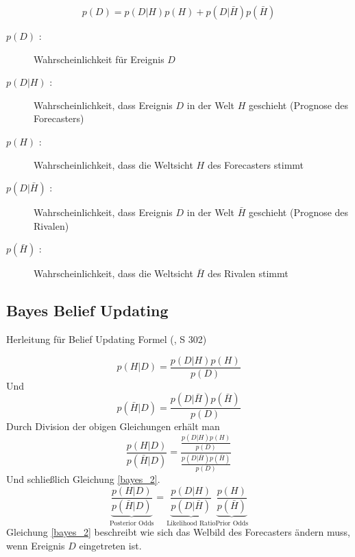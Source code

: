 \begin{equation}
p(D) = p(D \vert H) p(H) + p (D \vert \bar{H}) p(\bar{H})
\label{bayes_1}
\end{equation}

\begin{description}
\item[$p(D)$ :] Wahrscheinlichkeit für Ereignis $D$
\item[$p(D \vert H)$ :] Wahrscheinlichkeit, dass Ereignis $D$ in der Welt $H$ geschieht (Prognose des Forecasters)
\item[$p(H)$ :] Wahrscheinlichkeit, dass die Weltsicht $H$ des Forecasters stimmt
\item[$p (D \vert \bar{H})$ :] Wahrscheinlichkeit, dass Ereignis $D$ in der Welt $\bar{H}$ geschieht (Prognose des Rivalen)
\item[$p(\bar{H})$ :] Wahrscheinlichkeit, dass die Weltsicht $\bar{H}$ des Rivalen stimmt
\end{description}

\subsection{Bayes Belief Updating}

Herleitung für Belief Updating Formel (\cite{Tetlock}, S 302)

\begin{equation*}
p(H \vert D)  = \frac{ p(D \vert H) p(H) }{p(D)}
\end{equation*}
Und
\begin{equation*}
p(\bar{H} \vert D)  = \frac{ p(D \vert \bar{H}) p(\bar{H}) }{p(D)}
\end{equation*}
Durch Division der obigen Gleichungen erhält man
\begin{equation*}
\frac{p(H \vert D)}{p(\bar{H} \vert D)}  = \frac{\frac{ p(D \vert H) p(H) }{p(D)}}{\frac{ p(D \vert \bar{H}) p(\bar{H}) }{p(D)}}
\end{equation*}
Und schließlich Gleichung \ref{bayes_2}.
\begin{equation}
\underbrace{
\frac{p(H \vert D)}{p(\bar{H} \vert D)}
}_\textrm{Posterior Odds}  = \underbrace{
\frac{p(D \vert H)}{ p(D \vert \bar{H})}
}_\textrm{Likelihood Ratio} \underbrace{ \frac{p(H)}{p(\bar{H})}}_\textrm{Prior Odds}
\label{bayes_2}
\end{equation}
Gleichung \ref{bayes_2} beschreibt wie sich das Welbild des Forecasters ändern muss, wenn Ereignis $D$ eingetreten ist.

